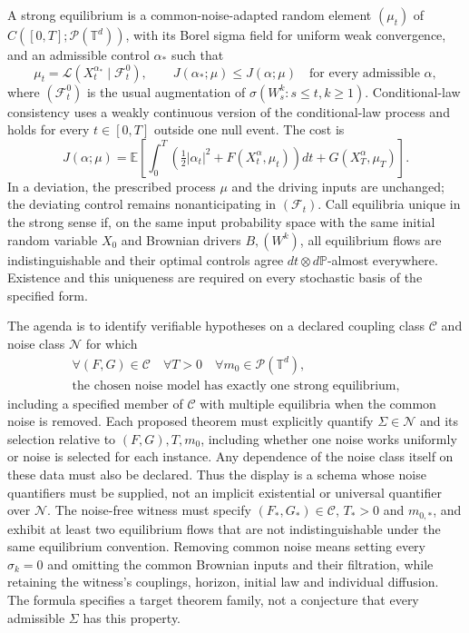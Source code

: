 \documentclass[11pt,a4paper]{article}
\begin{document}
A strong equilibrium is a common-noise-adapted random element $(\mu_t)$ of $C([0,T];\mathcal P(\mathbb T^d))$, with its Borel sigma field for uniform weak convergence, and an admissible control $\alpha_*$ such that
\[
 \mu_t=\mathcal L(X_t^{\alpha_*}\mid\mathcal F_t^0),\qquad
 J(\alpha_*;\mu)\leq J(\alpha;\mu)\quad\text{for every admissible }\alpha,
\]
where $(\mathcal F_t^0)$ is the usual augmentation of $\sigma(W_s^k:s\leq t,k\geq1)$. Conditional-law consistency uses a weakly continuous version of the conditional-law process and holds for every $t\in[0,T]$ outside one null event. The cost is
\[
 J(\alpha;\mu)=\mathbb E\!\left[\int_0^T
 \left(\tfrac12|\alpha_t|^2+F(X_t^\alpha,\mu_t)\right)dt
 +G(X_T^\alpha,\mu_T)\right].
\]
In a deviation, the prescribed process $\mu$ and the driving inputs are unchanged; the deviating control remains nonanticipating in $(\mathcal F_t)$. Call equilibria unique in the strong sense if, on the same input probability space with the same initial random variable $X_0$ and Brownian drivers $B,(W^k)$, all equilibrium flows are indistinguishable and their optimal controls agree $dt\otimes d\mathbb P$-almost everywhere. Existence and this uniqueness are required on every stochastic basis of the specified form.

The agenda is to identify verifiable hypotheses on a declared coupling class $\mathcal C$ and noise class $\mathcal N$ for which
\[
 \begin{gathered}
 \forall (F,G)\in\mathcal C\quad\forall T>0\quad
 \forall m_0\in\mathcal P(\mathbb T^d),\\
 \text{the chosen noise model has exactly one strong equilibrium},
 \end{gathered}
\]
including a specified member of $\mathcal C$ with multiple equilibria when the common noise is removed. Each proposed theorem must explicitly quantify $\Sigma\in\mathcal N$ and its selection relative to $(F,G),T,m_0$, including whether one noise works uniformly or noise is selected for each instance. Any dependence of the noise class itself on these data must also be declared. Thus the display is a schema whose noise quantifiers must be supplied, not an implicit existential or universal quantifier over $\mathcal N$. The noise-free witness must specify $(F_*,G_*)\in\mathcal C$, $T_*>0$ and $m_{0,*}$, and exhibit at least two equilibrium flows that are not indistinguishable under the same equilibrium convention. Removing common noise means setting every $\sigma_k=0$ and omitting the common Brownian inputs and their filtration, while retaining the witness's couplings, horizon, initial law and individual diffusion. The formula specifies a target theorem family, not a conjecture that every admissible $\Sigma$ has this property.
\end{document}
